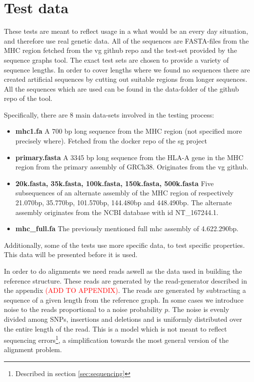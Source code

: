 \documentclass[thesis.tex]{subfiles}
\begin{document}
\section{Test data}
These tests are meant to reflect usage in a what would be an every day situation, and therefore use real genetic data. All of the sequences are FASTA-files from the MHC region fetched from the vg github repo\cite{vg} and the test-set provided by the sequence graphs tool\cite{sequence_graphs}. The exact test sets are chosen to provide a variety of sequence lengths. In order to cover lengths where we found no sequences there are created artificial sequences by cutting out suitable regions from longer sequences. All the sequences which are used can be found in the data-folder of the github repo of the tool.\\
\par\noindent
Specifically, there are 8 main data-sets involved in the testing process:
\begin{itemize}
  \item \textbf{mhc1.fa} A 700 bp long sequence from the MHC region (not specified more precisely where). Fetched from the docker repo of the sg project
  \item \textbf{primary.fasta} A 3345 bp long sequence from the HLA-A gene in the MHC region from the primary assembly of GRCh38. Originates from the vg github.
  \item \textbf{20k.fasta, 35k.fasta, 100k.fasta, 150k.fasta, 500k.fasta} Five subsequences of an alternate assembly of the MHC region of respectively 21.070bp, 35.770bp, 101.570bp, 144.480bp and 448.490bp. The alternate assembly originates from the NCBI database\cite{ncbi} with id NT\_167244.1.
  \item \textbf{mhc\_full.fa} The previously mentioned full mhc assembly of 4.622.290bp.
\end{itemize}
Additionally, some of the tests use more specific data, to test specific properties. This data will be presented before it is used.\\
\par\noindent
In order to do alignments we need reads aswell as the data used in building the reference structure. These reads are generated by the read-generator described in the appendix \textcolor{red}{(ADD TO APPENDIX)}. The reads are generated by subtracting a sequence of a given length from the reference graph. In some cases we introduce noise to the reads proportional to a noise probability $p$. The noise is evenly divided among SNPs, insertions and deletions and is uniformly distributed over the entire length of the read. This is a model which is not meant to reflect sequencing errors\footnote{Described in section \ref{sec:sequencing}}, a simplification towards the most general version of the alignment problem.\\
\end{document}
